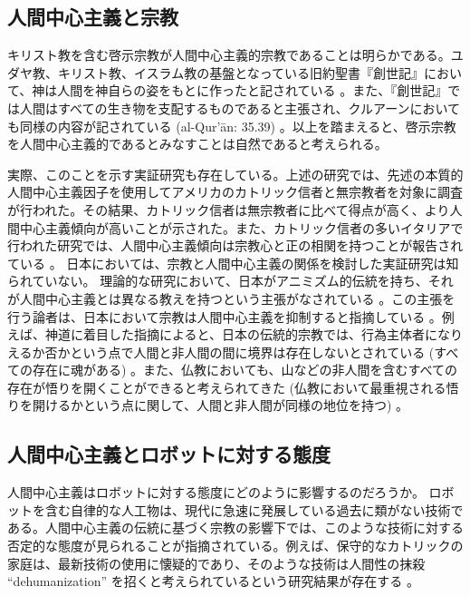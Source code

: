 \documentclass[a4j,12pt]{jreport}
\begin{document}
\subsection{人間中心主義と宗教}

キリスト教を含む啓示宗教が人間中心主義的宗教であることは明らかである。ユダヤ教、キリスト教、イスラム教の基盤となっている旧約聖書『創世記』において、神は人間を神自らの姿をもとに作ったと記されている\cite{hisimage} 。また、『創世記』では人間はすべての生き物を支配するものであると主張され、クルアーンにおいても同様の内容が記されている (al-Qur'\={a}n: 35.39) 。以上を踏まえると、啓示宗教を人間中心主義的であるとみなすことは自然であると考えられる。


実際、このことを示す実証研究も存在している。上述の研究\cite{chand}では、先述の本質的人間中心主義因子を使用してアメリカのカトリック信者と無宗教者を対象に調査が行われた。その結果、カトリック信者は無宗教者に比べて得点が高く、より人間中心主義傾向が高いことが示された。また、カトリック信者の多いイタリアで行われた研究では、人間中心主義傾向は宗教心と正の相関を持つことが報告されている\cite{fortu} 。
日本においては、宗教と人間中心主義の関係を検討した実証研究は知られていない。
理論的な研究において、日本がアニミズム的伝統を持ち、それが人間中心主義とは異なる教えを持つという主張がなされている\cite{abe, james, rots} 。この主張を行う論者は、日本において宗教は人間中心主義を抑制すると指摘している\cite{abe, rots} 。例えば、神道に着目した指摘\cite{rots}によると、日本の伝統的宗教では、行為主体者になりえるか否かという点で人間と非人間の間に境界は存在しないとされている (すべての存在に魂がある) 。また、仏教においても、山などの非人間を含むすべての存在が悟りを開くことができると考えられてきた (仏教において最重視される悟りを開けるかという点に関して、人間と非人間が同様の地位を持つ) \cite{abe} 。



\subsection{人間中心主義とロボットに対する態度}
人間中心主義はロボットに対する態度にどのように影響するのだろうか。
ロボットを含む自律的な人工物は、現代に急速に発展している過去に類がない技術である。人間中心主義の伝統に基づく宗教の影響下では、このような技術に対する否定的な態度が見られることが指摘されている。例えば、保守的なカトリックの家庭は、最新技術の使用に懐疑的であり、そのような技術は人間性の抹殺 ``dehumanization'' を招くと考えられているという研究結果が存在する\cite{catho} 。
\end{document}
